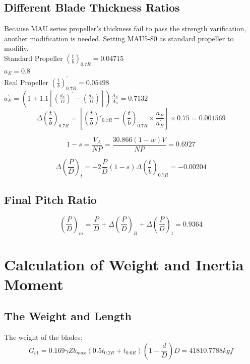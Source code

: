 \documentclass[a4paper,UTF8]{article}
\begin{document}
\subsection{Different Blade Thickness Ratios}
Because MAU series propeller's thickness fail to pass the strength varification, another modification is needed. Setting MAU5-80 as standard propeller to modifiy.\\
Standard Propeller $(\frac{t}{b})_{0.7R}=0.04715$\\
\qquad $a_E=0.8$\\
Real Propeller $(\frac{t}{b})^\prime_{0.7R}=0.05498$\\
\qquad $a_E^\prime = (1+1.1[(\frac{d_h}{D})^\prime-(\frac{d_h}{D})])\frac{A_E}{A_0}=0.7132$\\
\begin{equation}
\Delta(\frac{t}{b})_{0.7R} =[ (\frac{t}{b})'_{0.7R} - (\frac{t}{b})_{0.7R}\times\frac{a_E}{a_E^\prime}]\times 0.75 = 0.001569
\end{equation}

\begin{equation}
1-s = \frac{V_A}{NP} = \frac{30.866(1-w)V}{NP} =0.6927
\end{equation}

\begin{equation}
\Delta (\frac{P}{D})_t = -2\frac{P}{D}(1-s)\Delta(\frac{t}{b})_{0.7R} = -0.00204
\end{equation}

\subsection{Final Pitch Ratio}
\begin{equation}
(\frac{P}{D})_m = \frac{P}{D} + \Delta(\frac{P}{D})_B + \Delta(\frac{P}{D})_t =0.9364
\end{equation}


\section{Calculation of Weight and Inertia Moment}
\subsection{The Weight and Length}
The weight of the blades:
\begin{equation}
G_{b1}=0.169\gamma Zb_{max}\left(0.5t_{0.2R}+t_{0.6R}\right)\left(1-\frac{d}{D}\right)D=41810.7788kgf
\end{equation}
\end{document}
